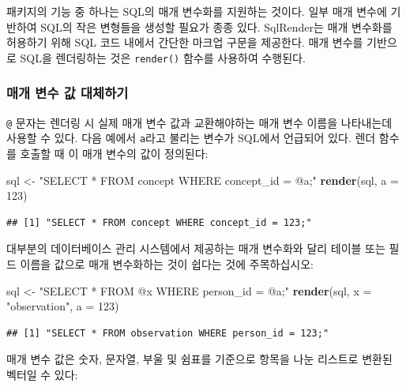 \documentclass[11pt]{book}
\newenvironment{Shaded}{\begin{snugshade}}{\end{snugshade}}
\newcommand{\KeywordTok}[1]{\textcolor[rgb]{0.13,0.29,0.53}{\textbf{#1}}}
\newcommand{\DataTypeTok}[1]{\textcolor[rgb]{0.13,0.29,0.53}{#1}}
\newcommand{\DecValTok}[1]{\textcolor[rgb]{0.00,0.00,0.81}{#1}}
\newcommand{\StringTok}[1]{\textcolor[rgb]{0.31,0.60,0.02}{#1}}
\newcommand{\NormalTok}[1]{#1}
\theoremstyle{definition}
\theoremstyle{definition}
\theoremstyle{definition}
\theoremstyle{remark}
\begin{document}
패키지의 기능 중 하나는 SQL의 매개 변수화를 지원하는 것이다. 일부 매개
변수에 기반하여 SQL의 작은 변형들을 생성할 필요가 종종 있다. SqlRender는
매개 변수화를 허용하기 위해 SQL 코드 내에서 간단한 마크업 구문을
제공한다. 매개 변수를 기반으로 SQL을 렌더링하는 것은 \texttt{render()}
함수를 사용하여 수행된다. 

\subsubsection*{매개 변수 값 대체하기}\label{---}

\texttt{@} 문자는 렌더링 시 실제 매개 변수 값과 교환해야하는 매개 변수
이름을 나타내는데 사용할 수 있다. 다음 예에서 \texttt{a}라고 불리는
변수가 SQL에서 언급되어 있다. 렌더 함수를 호출할 때 이 매개 변수의 값이
정의된다:

\begin{Shaded}
\begin{Highlighting}[]
\NormalTok{sql <-}\StringTok{ "SELECT * FROM concept WHERE concept_id = @a;"}
\KeywordTok{render}\NormalTok{(sql, }\DataTypeTok{a =} \DecValTok{123}\NormalTok{)}
\end{Highlighting}
\end{Shaded}

\begin{verbatim}
## [1] "SELECT * FROM concept WHERE concept_id = 123;"
\end{verbatim}

대부분의 데이터베이스 관리 시스템에서 제공하는 매개 변수화와 달리 테이블
또는 필드 이름을 값으로 매개 변수화하는 것이 쉽다는 것에 주목하십시오:

\begin{Shaded}
\begin{Highlighting}[]
\NormalTok{sql <-}\StringTok{ "SELECT * FROM @x WHERE person_id = @a;"}
\KeywordTok{render}\NormalTok{(sql, }\DataTypeTok{x =} \StringTok{"observation"}\NormalTok{, }\DataTypeTok{a =} \DecValTok{123}\NormalTok{)}
\end{Highlighting}
\end{Shaded}

\begin{verbatim}
## [1] "SELECT * FROM observation WHERE person_id = 123;"
\end{verbatim}

매개 변수 값은 숫자, 문자열, 부울 및 쉼표를 기준으로 항목을 나눈
리스트로 변환된 벡터일 수 있다:
\end{document}
